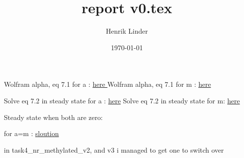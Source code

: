 \documentclass{article}
\title{report v0.tex }
\author{Henrik Linder}
\date{\today}
\begin{document}
\maketitle

Wolfram alpha, eq 7.1 for a  : \href{https://www.wolframalpha.com/input?i=solve+0+\%3D+alpha*\%28a*\%281-a-m\%29+-+a*m\%29+\%2B+\%281+-+alpha\%29*\%28\%281-a-m\%29\%2F2+-+a\%29+for+a+}{here }
Wolfram alpha, eq 7.1 for m  : \href{https://www.wolframalpha.com/input?i=solve+0+%3D+alpha*%28a*%281-a-m%29+-+a*m%29+%2B+%281+-+alpha%29*%28%281-a-m%29%2F2+-+a%29+for+m}{here }

Solve eq 7.2 in steady state for a : \href{https://www.wolframalpha.com/input?i=solve+0+\%3D+alpha*\%28m*\%281-a-m\%29+-+a*m\%29+\%2B+\%281+-+alpha\%29*\%28\%281-a-m\%29\%2F2+-+a\%29+for+a+}{here}
Solve eq 7.2 in steady state for m: \href{https://www.wolframalpha.com/input?i=solve+0+%3D+alpha*%28m*%281-a-m%29+-+a*m%29+%2B+%281+-+alpha%29*%28%281-a-m%29%2F2+-+a%29+for+m}{here}




Steady state when both are zero: 

for a=m : 
\href{https://www.wolframalpha.com/input?i=solve+0+%3D+alpha*%28a*%281-a-a%29+-+a*a%29+%2B+%281+-+alpha%29*%28%281-a-a%29%2F2+-+a%29+for+a+}{sloution}







in task4_nr_methylated_v2, and v3 i managed to get one to switch over 
\end{document}
